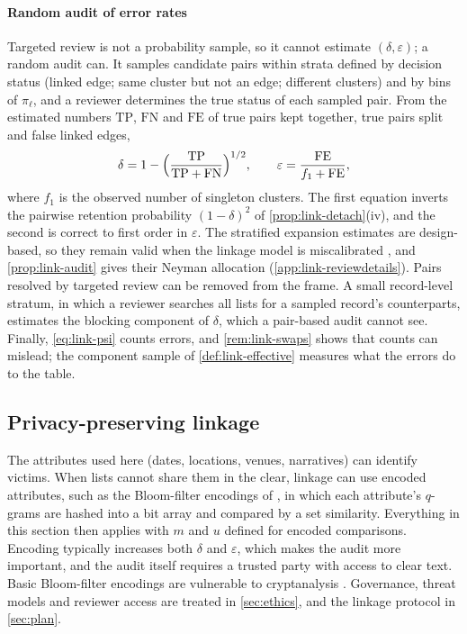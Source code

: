 \paragraph{Random audit of error rates}
Targeted review is not a probability sample, so it cannot estimate $(\delta,\varepsilon)$; a random audit can. It samples candidate pairs within strata defined by decision status (linked edge; same cluster but not an edge; different clusters) and by bins of $\pi_\ell$, and a reviewer determines the true status of each sampled pair. From the estimated numbers $\mathrm{TP}$, $\mathrm{FN}$ and $\mathrm{FE}$ of true pairs kept together, true pairs split and false linked edges,
\begin{equation}\label{eq:link-psi}
  \delta=1-\Bigl(\frac{\mathrm{TP}}{\mathrm{TP}+\mathrm{FN}}\Bigr)^{1/2},\qquad
  \varepsilon=\frac{\mathrm{FE}}{f_1+\mathrm{FE}},
\end{equation}
where $f_1$ is the observed number of singleton clusters. The first equation inverts the pairwise retention probability $(1-\delta)^2$ of \cref{prop:link-detach}(iv), and the second is correct to first order in $\varepsilon$. The stratified expansion estimates are design-based, so they remain valid when the linkage model is miscalibrated \citep{belin1995}, and \cref{prop:link-audit} gives their Neyman allocation (\cref{app:link-reviewdetails}). Pairs resolved by targeted review can be removed from the frame. A small record-level stratum, in which a reviewer searches all lists for a sampled record's counterparts, estimates the blocking component of $\delta$, which a pair-based audit cannot see. Finally, \eqref{eq:link-psi} counts errors, and \cref{rem:link-swaps} shows that counts can mislead; the component sample of \cref{def:link-effective} measures what the errors do to the table.

\subsection{Privacy-preserving linkage}\label{sec:link-pprl}

The attributes used here (dates, locations, venues, narratives) can identify victims. When lists cannot share them in the clear, linkage can use encoded attributes, such as the Bloom-filter encodings of \citet{schnell2009}, in which each attribute's $q$-grams are hashed into a bit array and compared by a set similarity. Everything in this section then applies with $m$ and $u$ defined for encoded comparisons. Encoding typically increases both $\delta$ and $\varepsilon$, which makes the audit more important, and the audit itself requires a trusted party with access to clear text. Basic Bloom-filter encodings are vulnerable to cryptanalysis \citep{kuzu2011,niedermeyer2014,christen2019}. Governance, threat models and reviewer access are treated in \cref{sec:ethics}, and the linkage protocol in \cref{sec:plan}.
